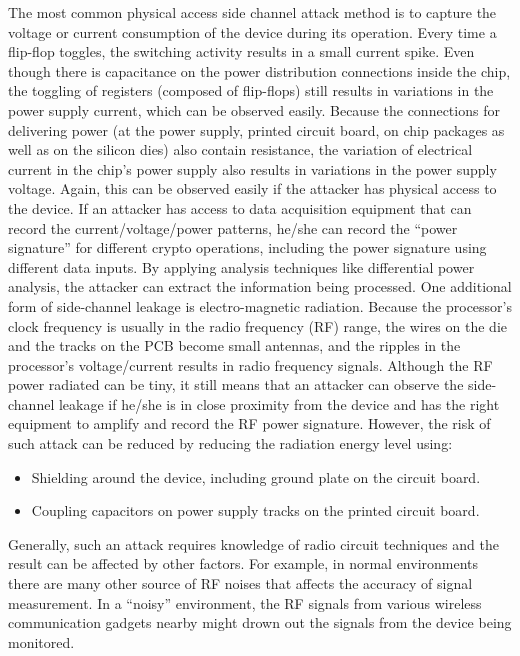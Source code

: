 \documentclass[a4paper,]{report}
\providecommand{\tightlist}{%
  \setlength{\itemsep}{0pt}\setlength{\parskip}{0pt}}
\begin{document}
The most common physical access side channel attack method is to capture
the voltage or current consumption of the device during its operation.
Every time a flip-flop toggles, the switching activity results in a
small current spike. Even though there is capacitance on the power
distribution connections inside the chip, the toggling of registers
(composed of flip-flops) still results in variations in the power supply
current, which can be observed easily. Because the connections for
delivering power (at the power supply, printed circuit board, on chip
packages as well as on the silicon dies) also contain resistance, the
variation of electrical current in the chip's power supply also results
in variations in the power supply voltage. Again, this can be observed
easily if the attacker has physical access to the device. If an attacker
has access to data acquisition equipment that can record the
current/voltage/power patterns, he/she can record the ``power
signature'' for different crypto operations, including the power
signature using different data inputs. By applying analysis techniques
like differential power analysis, the attacker can extract the
information being processed. One additional form of side-channel leakage
is electro-magnetic radiation. Because the processor's clock frequency
is usually in the radio frequency (RF) range, the wires on the die and
the tracks on the PCB become small antennas, and the ripples in the
processor's voltage/current results in radio frequency signals. Although
the RF power radiated can be tiny, it still means that an attacker can
observe the side-channel leakage if he/she is in close proximity from
the device and has the right equipment to amplify and record the RF
power signature. However, the risk of such attack can be reduced by
reducing the radiation energy level using:

\begin{itemize}
\tightlist
\item
  Shielding around the device, including ground plate on the circuit
  board.
\item
  Coupling capacitors on power supply tracks on the printed circuit
  board.
\end{itemize}

Generally, such an attack requires knowledge of radio circuit techniques
and the result can be affected by other factors. For example, in normal
environments there are many other source of RF noises that affects the
accuracy of signal measurement. In a ``noisy'' environment, the RF
signals from various wireless communication gadgets nearby might drown
out the signals from the device being monitored.
\end{document}
